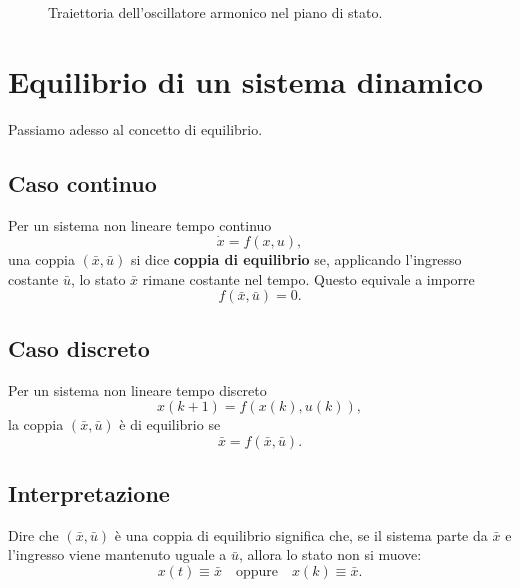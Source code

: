 \begin{figure}[h!]
\centering
{}
\caption{Traiettoria dell'oscillatore armonico nel piano di stato.}
\end{figure}

\bigskip

\section{Equilibrio di un sistema dinamico}

Passiamo adesso al concetto di equilibrio.

\subsection{Caso continuo}
Per un sistema non lineare tempo continuo
\[
\dot x = f(x,u),
\]
una coppia \((\bar x,\bar u)\) si dice \textbf{coppia di equilibrio} se, applicando l'ingresso costante \(\bar u\), lo stato \(\bar x\) rimane costante nel tempo. Questo equivale a imporre
\[
f(\bar x,\bar u)=0.
\]

\subsection{Caso discreto}
Per un sistema non lineare tempo discreto
\[
x(k+1)=f(x(k),u(k)),
\]
la coppia \((\bar x,\bar u)\) è di equilibrio se
\[
\bar x=f(\bar x,\bar u).
\]

\subsection*{Interpretazione}
Dire che \((\bar x,\bar u)\) è una coppia di equilibrio significa che, se il sistema parte da \(\bar x\) e l'ingresso viene mantenuto uguale a \(\bar u\), allora lo stato non si muove:
\[
x(t)\equiv \bar x
\quad \text{oppure} \quad
x(k)\equiv \bar x.
\]

